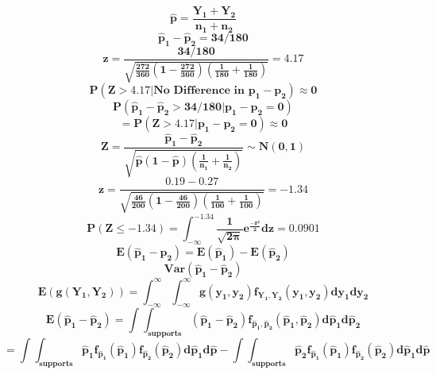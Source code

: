 \documentclass[12pt,portrait,semhelv,semrot]{article}
\begin{document}
{{$$\boldsymbol{\hat{p}= \frac{Y_1+Y_2}{n_1+n_2}}$$
$$\boldsymbol{\hat{p}_1-\hat{p}_2 = 34/180}$$
$$\boldsymbol{z = \frac{34/180}{\sqrt{\frac{272}{360}\left(1-\frac{272}{360}\right)\left(\frac{1}{180}+\frac{1}{180}\right)}}=4.17}$$
$$\boldsymbol{P(Z>4.17|\mbox{No Difference in } p_1-p_2)\approx 0}$$
$$\boldsymbol{P\left(\hat{p}_1-\hat{p}_2 > 34/180|p_1-p_2=0\right)}$$
$$\boldsymbol{= P(Z > 4.17|p_1-p_2=0) \approx 0}$$
$$\boldsymbol{Z = \frac{\hat{p}_1-\hat{p}_2}{\sqrt{\hat{p}(1-\hat{p})(\frac{1}{n_1}+\frac{1}{n_2})}}\sim N(0,1)}$$
$$\boldsymbol{z = \frac{0.19-0.27}{\sqrt{\frac{46}{200}\left(1-\frac{46}{200}\right)\left(\frac{1}{100}+\frac{1}{100}\right)}}=-1.34}$$
$$\boldsymbol{P(Z\leq -1.34) = \int_{-\infty}^{-1.34}\frac{1}{\sqrt{2\pi}}e^{\frac{-z^2}{2}}dz =0.0901}$$
$$\boldsymbol{E\left(\hat{p}_1-\hat{p}_2\right) = E\left(\hat{p}_1\right)-E\left(\hat{p}_2\right)}$$
$$\boldsymbol{Var(\hat{p}_1-\hat{p}_2)}$$
$$\boldsymbol{E(g(Y_1, Y_2)) = \int_{-\infty}^{\infty}\int_{-\infty}^{\infty}g(y_1,y_2)f_{Y_1,Y_2}(y_1,y_2)dy_1dy_2}$$
$$\boldsymbol{E(\hat{p}_1-\hat{p}_2) = \int\int_{supports} (\hat{p}_1-\hat{p}_2)f_{\hat{p}_1,\hat{p}_2}(\hat{p}_1,\hat{p}_2)d\hat{p}_1d\hat{p}_2}$$
$$\boldsymbol{= \int\int_{supports} \hat{p}_1f_{\hat{p}_1}(\hat{p}_1)f_{\hat{p}_2}(\hat{p}_2)d\hat{p}_1d\hat{p} -\int\int_{supports} \hat{p}_2f_{\hat{p}_1}(\hat{p}_1)f_{\hat{p}_2}(\hat{p}_2)d\hat{p}_1d\hat{p}}$$
}}
\end{document}
